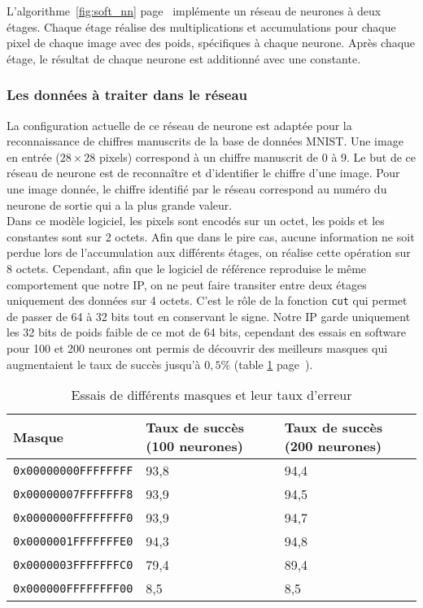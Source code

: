 L'algorithme~\ref{fig:soft_nn} page~\pageref{fig:soft_nn} implémente un réseau de neurones à deux étages.
Chaque étage réalise des multiplications et accumulations pour chaque pixel de
chaque image avec des poids, spécifiques à chaque neurone. Après chaque étage,
le résultat de chaque neurone est additionné avec une constante.

\subsubsection{Les données à traiter dans le réseau}

La configuration actuelle de ce réseau de neurone est adaptée pour la
reconnaissance de chiffres manuscrits de la base de données MNIST\cite{lecun2010mnist}. Une image
en entrée ($28 \times 28$ pixels) correspond à un chiffre manuscrit de 0 à 9.
Le but de ce réseau de neurone est de reconnaître et d'identifier le chiffre
d'une image. Pour une image donnée, le chiffre identifié par le réseau correspond
au numéro du neurone de sortie qui a la plus grande valeur. \\
Dans ce modèle logiciel, les pixels sont encodés sur un octet, les poids et les
constantes sont sur 2 octets. Afin que dans le pire cas, aucune information ne
soit perdue lors de l'accumulation aux différents étages, on réalise cette opération sur
8 octets. Cependant, afin que le logiciel de référence reproduise le même
comportement que notre IP, on ne peut faire transiter entre deux étages uniquement
des données sur 4 octets. C'est
le rôle de la fonction \texttt{cut} qui permet de passer de 64 à 32 bits tout
en conservant le signe.
Notre IP garde uniquement les 32 bits de poids faible de ce mot de 64 bits,
cependant des essais en software pour 100 et 200 neurones ont permis de découvrir
des meilleurs masques qui augmentaient le taux de succès jusqu'à $0,5\%$
(table
\ref{fig:masques} page~\pageref{fig:masques}).

\begin{table}[h!]
\centering
	\begin{tabular}{| l | l | l |}
	\hline
	Masque & Taux de succès (100 neurones) & Taux de succès (200 neurones)\\ \hline
	\texttt{0x00000000FFFFFFFF} & 93,8 & 94,4 \\ \hline
	\texttt{0x00000007FFFFFFF8} & 93,9 & 94,5 \\ \hline
	\texttt{0x0000000FFFFFFFF0} & 93,9 & 94,7 \\ \hline
	\texttt{0x0000001FFFFFFFE0} & 94,3 & 94,8 \\ \hline
	\texttt{0x0000003FFFFFFFC0} & 79,4 & 89,4 \\ \hline
	\texttt{0x000000FFFFFFFF00} & 8,5  & 8,5  \\ \hline
	\end{tabular}
	\caption{Essais de différents masques et leur taux d'erreur}
	\label{fig:masques}
\end{table}

